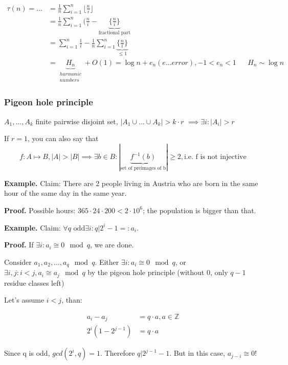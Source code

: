\begin{align*}
\tau(n) = ... &=
    \frac{1}{n} \sum_{i=1}^n \lfloor\frac{n}{i}\rfloor \\
    &= \frac{1}{n} \sum_{i=1}^n (\frac{n}{i} -
        \underbrace{\{\frac ni\}}_{\text{fractional part}} \\
    &= \sum_{i=1}^n \frac1i -
        \frac1n\sum_{i=1}^n
            \underbrace{\{\frac ni\}}_{≤ 1} \\
    &=  \underbrace{H_n}_{\begin{matrix}harmonic \\ numbers\end{matrix}} + O(1) =
        \log n + e_n (e ... error), -1 < e_n < 1 && H_n\sim \log n
\end{align*}


\subsubsection{Pigeon hole principle}

$A_1, \ldots , A_k$ finite pairwise disjoint set,
$|A_1 \cup \ldots \cup A_k| > k\cdot r$
$\implies \exists i : |A_i| > r$

If $r=1$, you can also say that
\[
    f: A\mapsto B, |A| > |B| \implies \exists b \in B :
    |\underbrace{f^{-1}(b)}_{\text{set of preimages of b}}|
        ≥ 2 ,
        \text{i.e. f is not injective}
\]


\textbf{Example.}
Claim: There are 2 people living in Austria who are born in the same hour of the same day in the same year.

\textbf{Proof.}
Possible hours: $365\cdot 24\cdot 200 < 2\cdot 10^6$;
the population is bigger than that.


\textbf{Example.}
Claim: $\forall q\text{ odd} \exists i: q | 2^i-1 =: a_i$.

\textbf{Proof.}
If $\exists i: a_i \cong 0 \mod q$, we are done.

Consider $a_1, a_2,\ldots, a_q \mod q$.
Either $\exists i: a_i \cong 0 \mod q$,
or $\exists i,j: i < j, a_i \cong a_j \mod q$
by the pigeon hole principle (without 0, only $q-1$ residue classes left)

Let's assume $i < j$, than:

\begin{align*}
a_i - a_j &= q\cdot a, a\in\mathbb{Z} \\
2^i(1 - 2^{j-1}) &= q\cdot a
\end{align*}

Since q is odd, $gcd(2^i, q)=1$. Therefore $q | 2^{j-1} - 1$. But in this case, $a_{j-i}\cong 0$!


